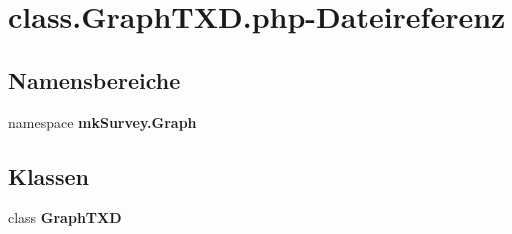 \section{class.GraphTXD.php-Dateireferenz}
\label{class_8GraphTXD_8php}
\subsection*{Namensbereiche}
\begin{CompactItemize}
\item 
namespace {\bf mkSurvey.Graph}
\end{CompactItemize}
\subsection*{Klassen}
\begin{CompactItemize}
\item 
class {\bf GraphTXD}
\end{CompactItemize}
